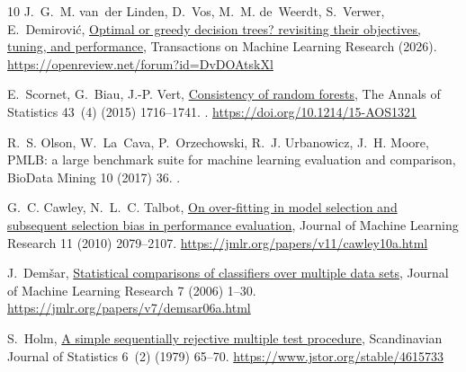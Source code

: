 \documentclass[final,5p,times]{elsarticle}
\begin{document}
\begin{thebibliography}{10}
J.~G.~M. van~der Linden, D.~Vos, M.~M. de~Weerdt, S.~Verwer, E.~Demirovi{\'c},
  \href{https://openreview.net/forum?id=DvDOAtskXl}{Optimal or greedy decision
  trees? revisiting their objectives, tuning, and performance}, Transactions on
  Machine Learning Research (2026).
\newline\urlprefix\url{https://openreview.net/forum?id=DvDOAtskXl}

E.~Scornet, G.~Biau, J.-P. Vert,
  \href{https://doi.org/10.1214/15-AOS1321}{Consistency of random forests}, The
  Annals of Statistics 43~(4) (2015) 1716--1741.
\newblock \href {https://doi.org/10.1214/15-AOS1321}
  {}.
\newline\urlprefix\url{https://doi.org/10.1214/15-AOS1321}

R.~S. Olson, W.~La~Cava, P.~Orzechowski, R.~J. Urbanowicz, J.~H. Moore, {PMLB}:
  a large benchmark suite for machine learning evaluation and comparison,
  BioData Mining 10 (2017) 36.
\newblock \href {https://doi.org/10.1186/s13040-017-0154-4}
  {}.

G.~C. Cawley, N.~L.~C. Talbot,
  \href{https://jmlr.org/papers/v11/cawley10a.html}{On over-fitting in model
  selection and subsequent selection bias in performance evaluation}, Journal
  of Machine Learning Research 11 (2010) 2079--2107.
\newline\urlprefix\url{https://jmlr.org/papers/v11/cawley10a.html}

J.~Dem{\v s}ar, \href{https://jmlr.org/papers/v7/demsar06a.html}{Statistical
  comparisons of classifiers over multiple data sets}, Journal of Machine
  Learning Research 7 (2006) 1--30.
\newline\urlprefix\url{https://jmlr.org/papers/v7/demsar06a.html}

S.~Holm, \href{https://www.jstor.org/stable/4615733}{A simple sequentially
  rejective multiple test procedure}, Scandinavian Journal of Statistics 6~(2)
  (1979) 65--70.
\newline\urlprefix\url{https://www.jstor.org/stable/4615733}

\end{thebibliography}
\end{document}
